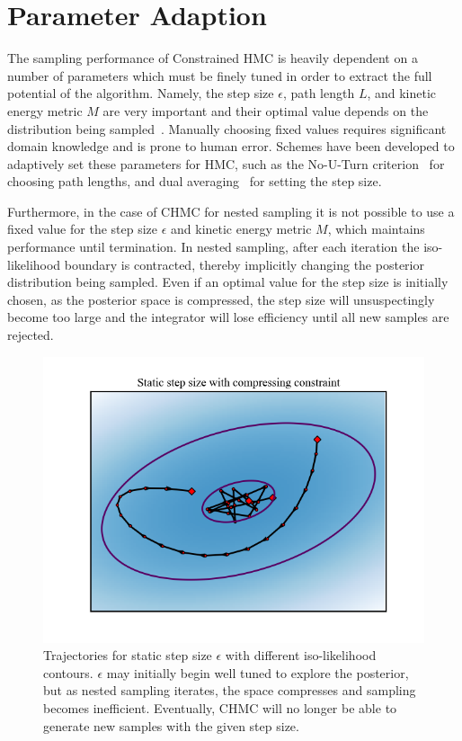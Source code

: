 \documentclass[11pt]{article}
\begin{document}
\section{Parameter Adaption}\label{sec:param_adaption}
    The sampling performance of Constrained HMC is heavily dependent on a number of parameters which must be finely
    tuned in order to extract the full potential of the algorithm.
    Namely, the step size $\epsilon$, path length $L$, and kinetic energy metric $M$ are very important and their
    optimal value depends on the distribution being sampled~\cite{MCMChamiltonian}.
    Manually choosing fixed values requires significant domain knowledge and is prone to human error.
    Schemes have been developed to adaptively set these parameters for HMC, such as the No-U-Turn
    criterion~\cite{hoffman2011nouturn} for choosing path lengths, and dual averaging~\cite{nesterov_dual_averaging}
    for setting the step size.

    Furthermore, in the case of CHMC for nested sampling it is not possible to use a fixed value for the
    step size $\epsilon$ and kinetic energy metric $M$, which maintains performance until termination.
    In nested sampling, after each iteration the iso-likelihood boundary is contracted, thereby implicitly changing the
    posterior distribution being sampled.
    Even if an optimal value for the step size is initially chosen, as the posterior space is compressed, the step size
    will unsuspectingly become too large and the integrator will lose efficiency until all new samples are rejected.

    \begin{figure}[t!]
        \center
        \includegraphics[width=\linewidth]{../figures/StaticStepSize}
        \caption{
            Trajectories for static step size $\epsilon$ with different iso-likelihood contours.
            $\epsilon$ may initially begin well tuned to explore the posterior, but as nested sampling iterates,
            the space compresses and sampling becomes inefficient.
            Eventually, CHMC will no longer be able to generate new samples with the given step size.
        }\label{fig:static_step_size}
    \end{figure}
\end{document}
